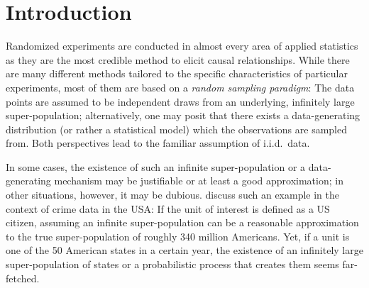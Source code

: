 \documentclass[aos]{imsart2}
\theoremstyle{plain}
\theoremstyle{definition}
\begin{document}


\section{Introduction}

Randomized experiments are conducted in almost every area of applied statistics as they are the most credible method to elicit causal relationships. While there are many different methods tailored to the specific characteristics of particular experiments, most of them are based on a \emph{random sampling paradigm}:
The data points are assumed to be independent draws from an underlying, infinitely large super-population; alternatively, one may posit that there exists a data-generating distribution (or rather a statistical model) which the observations are sampled from. Both perspectives lead to the familiar assumption of i.i.d.\ data.

In some cases, the existence of such an infinite super-population or a data-generating mechanism may be justifiable or at least a good approximation; in other situations, however, it may be dubious. \cite{manski_how_2018} discuss such an example in the context of crime data in the USA: If the unit of interest is defined as a US citizen, assuming an infinite super-population can be a reasonable approximation to the true super-population of roughly 340 million Americans. Yet, if a unit is one of the 50 American states in a certain year, the existence of an infinitely large super-population of states or a probabilistic process that creates them seems far-fetched.

\end{document}
